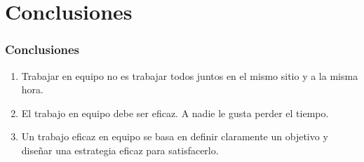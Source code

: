 \documentclass[a4paper,t,xcolor=pst,dvips]{beamer}
\begin{document}
\section{Conclusiones}

\begin{frame}[c]
	\frametitle{Conclusiones}
	\begin{enumerate}[<+->]
		\item Trabajar en equipo no es trabajar todos juntos en el mismo sitio y a la misma hora.
		\item El trabajo en equipo debe ser eficaz. A nadie le gusta perder el tiempo.
		\item Un trabajo eficaz en equipo se basa en definir claramente un objetivo y diseñar una estrategia eficaz para satisfacerlo.
	\end{enumerate}
\end{frame}
\end{document}
